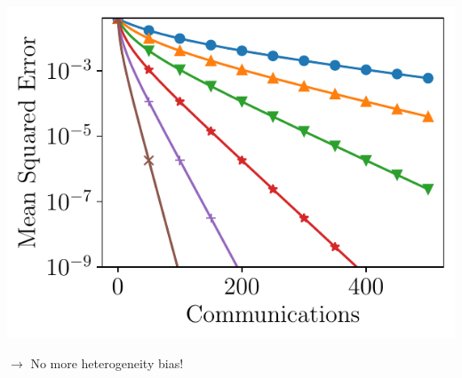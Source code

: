 \documentclass[aspectratio=169,12pt]{beamer}
\begin{document}
\begin{frame}[t]
\begin{minipage}{0.5\linewidth}
\begin{itemize}[leftmargin=*,itemsep=0em]
          
      
    \end{itemize}
      
  \end{minipage}~~~~~~%
  \begin{minipage}{0.48\linewidth}
  \pause
       \begin{center}
    \includegraphics[width=0.75\linewidth]{images/local_training_homogeneous.pdf}%
  \end{center}
  
    \vspace{-0.5em}

  $\rightarrow$ No more heterogeneity bias!

  \end{minipage}

  \vspace{1.5em}


\end{frame}
\end{document}

